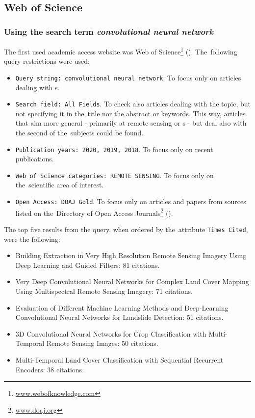 \subsection{Web of Science}
\label{wos-papers}

\subsubsection{Using the search term \textit{convolutional neural network}}
\label{wos-papers-full-length}

The first used academic access website was Web of Science\footnote{\url{www.webofknowledge.com}} (). The~following query restrictions were used:

\begin{itemize}
	\item \verb|Query string: convolutional neural network|. To focus only on articles dealing with s.
	\item \verb|Search field: All Fields|. To check also articles dealing with the topic, but not specifying it in the~title nor the abstract or keywords. This way, articles that aim more general - primarily at remote sensing or s - but deal also with the second of the~subjects could be found.
	\item \verb|Publication years: 2020, 2019, 2018|. To focus only on recent publications.
	\item \verb|Web of Science categories: REMOTE SENSING|. To focus only on the~scien\-ti\-fic area of interest.
	\item \verb|Open Access: DOAJ Gold|. To focus only on articles and papers from sources listed on the~Di\-rectory of Open Access Journals\footnote{\url{www.doaj.org}} ().
\end{itemize}

\noindent The top five results from the query, when ordered by the~attribute \verb|Times Cited|, were the following:

\begin{itemize}
	\item Building Extraction in Very High Resolution Remote Sensing Imagery Using Deep Learning and Guided Filters: 81 citations. \cite{res-u-net}
	\item Very Deep Convolutional Neural Networks for Complex Land Cover Mapping Using Multispectral Remote Sensing Imagery: 71 citations. \cite{very-deep-cnn-lc}
	\item Evaluation of Different Machine Learning Methods and Deep-Learning Convolutional Neural Networks for Landslide Detection: 51 citations. \cite{landslide-evaluation}
	\item 3D Convolutional Neural Networks for Crop Classification with Multi-Temporal Remote Sensing Images: 50 citations. \cite{3d-cnn-crop}
	\item Multi-Temporal Land Cover Classification with Sequential Recurrent Encoders: 38 citations. \cite{multi-temporal-sequential-recurrent}
\end{itemize}

